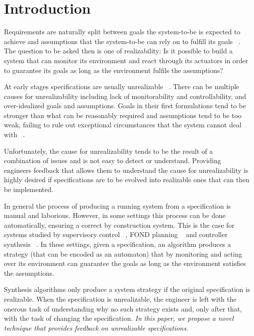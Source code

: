 \section{Introduction}


Requirements are naturally split between goals the system-to-be is expected to achieve and
assumptions that the system-to-be can rely on to fulfill its goals ~\cite{Jackson:1995,Letier:2002}. The question to be asked then is one of realizability: Is it possible to build a system that can monitor its environment and react through its actuators in order to guarantee its goals as long as the environment fulfils the assumptions?

At early stages specifications are usually unrealizable ~\cite{Letier:2002}. There can be multiple causes for unrealizability including lack of monitorability and controllability, and over-idealized goals and assumptions. Goals in their first formulations tend to be stronger than what can be reasonably required and assumptions tend to be too weak, failing to rule out exceptional circumstances that the system cannot deal with ~\cite{vanLamsweerde:2000}. 

Unfortunately, the cause for unrealizability tends to be the result of a combination of issues and is not easy to detect or understand. Providing engineers feedback that allows them to understand the cause for unrealizability is highly desired if specifications are to be evolved into realizable ones that can then be implemented. 

In general the process of producing a running system from a specification is manual and laborious. However, in some settings this process can be done automatically, ensuring a correct by construction system. This is the case for systems studied by supervisory control ~\cite{ramadge:1989}, FOND planning ~\cite{daniele:2000} and controller synthesis ~\cite{Maoz:2014,Bloem:2012}. 
In these settings, given a specification, an algorithm produces a strategy (that can be encoded as an automaton) that by monitoring and acting over its environment can guarantee the goals as long as the environment satisfies the assumptions. 

Synthesis algorithms only produce a system strategy if the original specification is realizable. 
When the specification is unrealizable, the engineer is left with the onerous task of understanding why no such strategy exists and, only after that, with the task of changing the specification.
\emph{In this paper, we propose a novel technique that provides feedback on unrealizable specifications}. 

